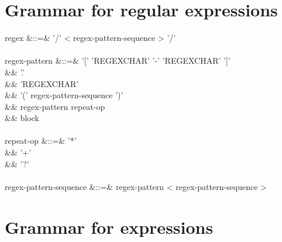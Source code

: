 \documentclass[11pt,a4paper]{article}
\begin{document}
\section{Grammar for regular expressions}

\begin{grammar}
regex &::=&  '/' < regex-pattern-sequence >  '/' \\
\\
regex-pattern &::=& '[' 'REGEXCHAR' '-' 'REGEXCHAR' ']'  \\
&&                  '.' \\
&&                  'REGEXCHAR' \\
&&                  '(' regex-pattern-sequence ')' \\
&&                  regex-pattern repeat-op \\
&&                  block \\
\\
repeat-op &::=& '*' \\
&&              '+' \\
&&              '?' \\
\\
regex-pattern-sequence &::=& regex-pattern < regex-pattern-sequence > \\
\end{grammar}

\section{Grammar for expressions}
\end{document}
